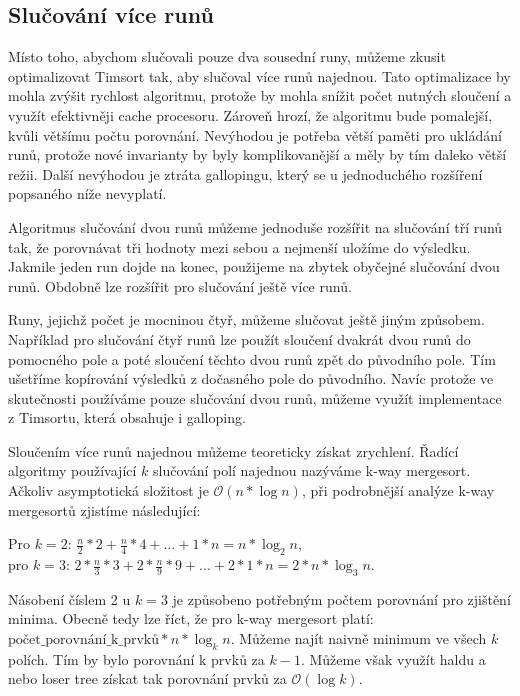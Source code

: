 \documentclass[thesis=B,czech]{FITthesis}[2019/12/23]
\begin{document}
\subsection{Slučování více runů}
Místo toho, abychom slučovali pouze dva sousední runy, můžeme zkusit optimalizovat Timsort tak, aby slučoval více runů najednou. Tato optimalizace by mohla zvýšit rychlost algoritmu, protože by mohla snížit počet nutných sloučení a využít efektivněji cache procesoru.\cite{3merge1} Zároveň hrozí, že algoritmu bude pomalejší, kvůli většímu počtu porovnání.\cite{3mergeresponse,kwaymergemax} Nevýhodou je potřeba větší paměti pro ukládání runů, protože nové invarianty by byly komplikovanější a měly by tím daleko větší režii. Další nevýhodou je ztráta gallopingu, který se u jednoduchého rozšíření popsaného níže nevyplatí. 

Algoritmus slučování dvou runů můžeme jednoduše rozšířit na slučování tří runů tak, že porovnávat tři hodnoty mezi sebou a nejmenší uložíme do výsledku. Jakmile jeden run dojde na konec, použijeme na zbytek obyčejné slučování dvou runů. Obdobně lze rozšířit pro slučování ještě více runů. 

Runy, jejichž počet je mocninou čtyř, můžeme slučovat ještě jiným způsobem. Například pro slučování čtyř runů lze použít sloučení dvakrát dvou runů do pomocného pole a poté sloučení těchto dvou runů zpět do původního pole. Tím ušetříme kopírování výsledků z dočasného pole do původního. Navíc protože ve skutečnosti používáme pouze slučování dvou runů, můžeme využít implementace z Timsortu, která obsahuje i galloping.

Sloučením více runů najednou můžeme teoreticky získat zrychlení.\cite{kwaymergemax} Řadící algoritmy používající $k$ slučování polí najednou nazýváme k-way mergesort. Ačkoliv asymptotická složitost je $ \mathcal{O}(n*\log{n}) $, při podrobnější analýze k-way mergesortů\cite{analysiskmerge} zjistíme následující: 
\begin{center}
Pro $ k = 2 $: $ \frac{n}{2}*2 + \frac{n}{4}*4 + ... + 1 * n = n * \log_2{n} $,
\\pro $ k = 3 $: $ 2*\frac{n}{3}*3 + 2*\frac{n}{9}*9 + ... + 2 * 1 * n = 2*n * \log_3{n} $.
\end{center}
Násobení číslem 2 u $ k = 3$ je způsobeno potřebným počtem porovnání pro zjištění minima.
Obecně tedy lze říct, že pro k-way mergesort platí:\linebreak $ \textrm{počet\_porovnání\_k\_prvků}*n*\log_k{n} $. 
Můžeme najít naivně minimum ve všech $k$ polích. Tím by bylo porovnání k prvků za $ k - 1 $. Můžeme však využít haldu a nebo loser tree získat tak porovnání prvků za $ \mathcal{O}(\log{k}) $.\cite{kwaymerge}
\end{document}
